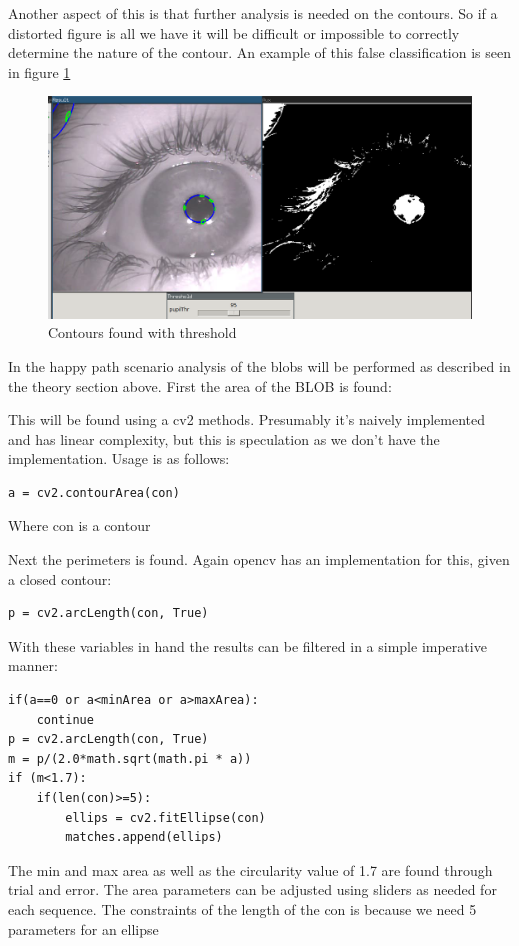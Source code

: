 Another aspect of this is that further analysis is needed on the
contours. So if a distorted figure is all we have it will be difficult
or impossible to correctly determine the nature of the contour. An
example of this false classification is seen in figure \ref{contourthr}

\begin{figure}[htbp]
\centering
\includegraphics{pics/threshold_contours.png}
\caption{Contours found with threshold \label{contourthr}}
\end{figure}

In the happy path scenario analysis of the blobs will be performed as
described in the theory section above. First the area of the BLOB is
found:

This will be found using a cv2 methods. Presumably it's naively
implemented and has linear complexity, but this is speculation as we
don't have the implementation. Usage is as follows:

\begin{verbatim}
a = cv2.contourArea(con)
\end{verbatim}
Where con is a contour

Next the perimeters is found. Again opencv has an implementation for
this, given a closed contour:

\begin{verbatim}
p = cv2.arcLength(con, True)
\end{verbatim}
With these variables in hand the results can be filtered in a simple
imperative manner:

\begin{verbatim}
if(a==0 or a<minArea or a>maxArea):
    continue
p = cv2.arcLength(con, True)
m = p/(2.0*math.sqrt(math.pi * a))
if (m<1.7):
    if(len(con)>=5):
        ellips = cv2.fitEllipse(con)
        matches.append(ellips)
\end{verbatim}
The min and max area as well as the circularity value of 1.7 are found
through trial and error. The area parameters can be adjusted using
sliders as needed for each sequence. The constraints of the length of
the con is because we need 5 parameters for an ellipse

